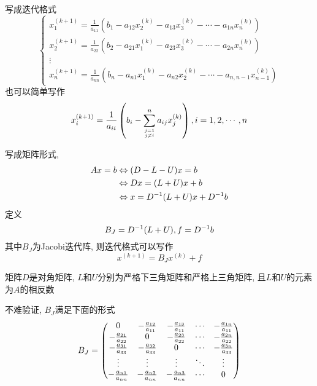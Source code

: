写成迭代格式
\begin{equation*}
    \begin{cases}
        x_1^{(k+1)}=\frac{1}{a_{11}}(b_1-a_{12}x_2^{(k)}-a_{13}x_3^{(k)}-\cdots-a_{1n}x_n^{(k)})\\
        x_2^{(k+1)}=\frac{1}{a_{22}}(b_2-a_{21}x_1^{(k)}-a_{23}x_3^{(k)}-\cdots-a_{2n}x_n^{(k)})\\
        \vdots\\
        x_n^{(k+1)}=\frac{1}{a_{nn}}(b_n-a_{n1}x_1^{(k)}-a_{n2}x_2^{(k)}-\cdots-a_{n,n-1}x_{n-1}^{(k)})
    \end{cases}
\end{equation*}
也可以简单写作
\begin{equation*}
    x_i^{(k+1)}=\frac{1}{a_{ii}}\left(b_i-\sum_{j=1\atop j\ne i}^na_{ij}x_j^{(k)}\right), i=1,2,\cdots,n
\end{equation*}

写成矩阵形式, 
\begin{align*}
    Ax=b&\Leftrightarrow(D-L-U)x=b\\
    &\Leftrightarrow Dx=(L+U)x+b\\
    &\Leftrightarrow x=D^{-1}(L+U)x+D^{-1}b
\end{align*}
定义
\begin{equation*}
    B_J=D^{-1}(L+U), f=D^{-1}b
\end{equation*}
其中$B_J$为Jacobi迭代阵, 则迭代格式可以写作
\begin{equation*}
    x^{(k+1)}=B_Jx^{(k)}+f
\end{equation*}

\begin{notice}
    矩阵$D$是对角矩阵, $L$和$U$分别为严格下三角矩阵和严格上三角矩阵, 且$L$和$U$的元素为$A$的相反数
\end{notice}

不难验证, $B_J$满足下面的形式
\begin{equation*}
    B_J=\mqty(
        0&-\frac{a_{12}}{a_{11}}&-\frac{a_{13}}{a_{11}}&\cdots&-\frac{a_{1n}}{a_{11}}\\
        -\frac{a_{21}}{a_{22}}&0&-\frac{a_{23}}{a_{22}}&\cdots&-\frac{a_{2n}}{a_{22}}\\
        -\frac{a_{31}}{a_{33}}&-\frac{a_{32}}{a_{33}}&0&\cdots&-\frac{a_{3n}}{a_{33}}\\
        \vdots&\vdots&\vdots&\ddots&\vdots\\
        -\frac{a_{n1}}{a_{nn}}&-\frac{a_{n2}}{a_{nn}}&-\frac{a_{n3}}{a_{nn}}&\cdots&0
    )
\end{equation*}

